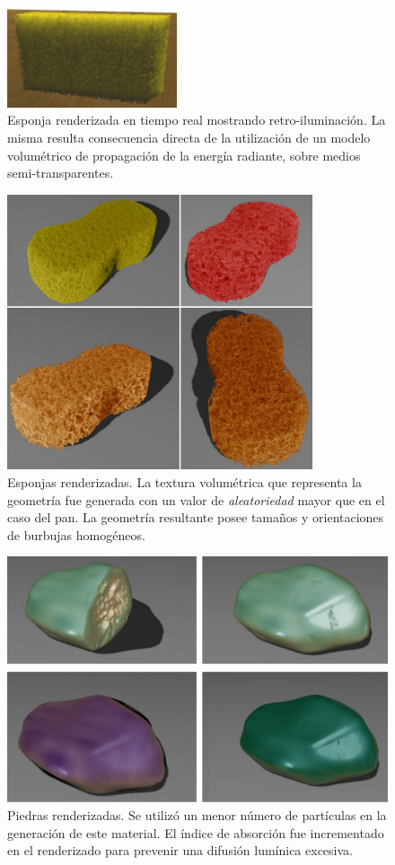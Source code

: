 \begin{figure}[htb!]
  \centerline{\includegraphics[width=5cm]{figures/fig7}}
  \caption[Esponja retro-iluminada.]{Esponja renderizada en tiempo real mostrando retro-iluminación. La misma resulta consecuencia directa de la utilización de un modelo volumétrico de propagación de la energía radiante, sobre medios semi-transparentes.}
  \label{fg:fig7}
\end{figure}


\begin{figure}
  \centerline{\includegraphics[width=9cm]{figures/Fig13CAVW}}
  \caption[Esponjas renderizadas]{Esponjas renderizadas. La textura volumétrica que representa la geometría fue generada con un valor de {\em aleatoriedad} mayor que en el caso del pan. La geometría resultante posee tamaños y orientaciones de burbujas homogéneos.}
  \label{fg:sponges}
\end{figure}

\begin{figure}
  \centerline{\includegraphics[width=12cm]{figures/Fig14CAVW}}
  \caption[Piedras renderizadas]{Piedras renderizadas. Se utilizó un menor número de partículas en la generación de este material. El índice de absorción fue incrementado en el renderizado para prevenir una difusión lumínica excesiva.}
  \label{fg:Fig14}
\end{figure}

